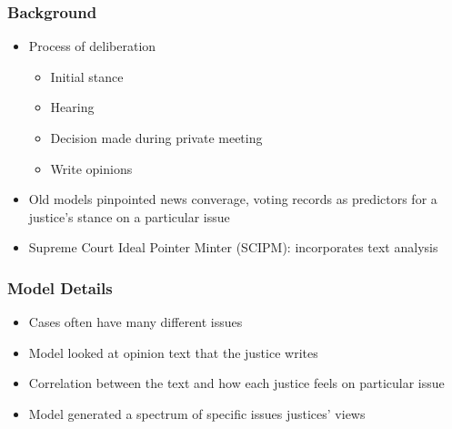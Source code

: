 \documentclass{beamer}
\begin{document}
\begin{frame}
\frametitle{Background}
\begin{itemize}
\item Process of deliberation
	\begin{itemize}
		\item Initial stance
		\item Hearing
		\item Decision made during private meeting
		\item Write opinions %
	\end{itemize}
\item Old models pinpointed news converage, voting records as predictors for a justice's stance on a particular issue
\item Supreme Court Ideal Pointer Minter (SCIPM): incorporates text analysis
\end{itemize}
\end{frame}


\begin{frame}
\frametitle{Model Details}

\begin{itemize}
	\item Cases often have many different issues
	\item Model looked at opinion text that the justice writes
	\item Correlation between the text and how each justice feels on particular issue
	\item Model generated a spectrum of specific issues justices' views %
\end{itemize}

\end{frame}
\end{document}
